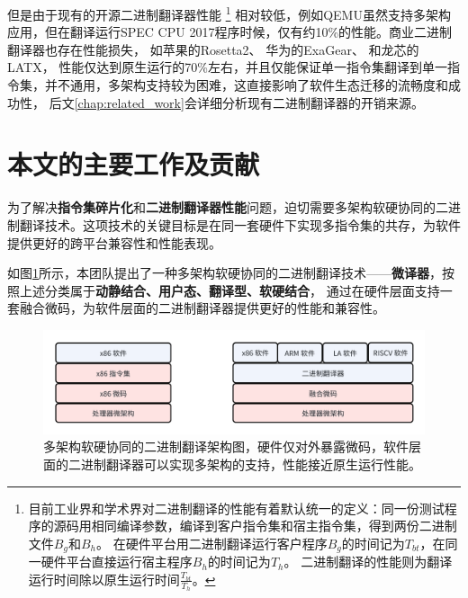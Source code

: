 但是由于现有的开源二进制翻译器性能
\footnote{
    目前工业界和学术界对二进制翻译的性能有着默认统一的定义：同一份测试程序的源码用相同编译参数，编译到客户指令集和宿主指令集，得到两份二进制文件$B_g$和$B_h$。
    在硬件平台用二进制翻译运行客户程序$B_g$的时间记为$T_{bt}$，在同一硬件平台直接运行宿主程序$B_h$的时间记为$T_h$。
    二进制翻译的性能则为翻译运行时间除以原生运行时间$\frac{T_{bt}}{T_h}$。
}
相对较低，例如QEMU\cite{bellardQEMUFastPortable2005}虽然支持多架构应用，但在翻译运行SPEC CPU 2017\cite{SPECCPU2017}程序时候，仅有约10\%的性能。商业二进制翻译器也存在性能损失，
如苹果的Rosetta2\cite{RosettaTranslationEnvironment, RunningIntelBinaries}、
华为的ExaGear\cite{KunPengExaGear}、
和龙芯的LATX\cite{LoongArchEnv2022, LoongArch2023}，
性能仅达到原生运行的70\%左右，并且仅能保证单一指令集翻译到单一指令集，并不通用，多架构支持较为困难，这直接影响了软件生态迁移的流畅度和成功性，
后文\ref{chap:related_work}会详细分析现有二进制翻译器的开销来源。

\section{本文的主要工作及贡献}

为了解决\textbf{指令集碎片化}和\textbf{二进制翻译器性能}问题，迫切需要多架构软硬协同的二进制翻译技术。这项技术的关键目标是在同一套硬件下实现多指令集的共存，为软件提供更好的跨平台兼容性和性能表现。

如图\ref{img:my_arch}所示，本团队提出了一种多架构软硬协同的二进制翻译技术——\textbf{微译器}，按照上述分类属于\textbf{动静结合、用户态、翻译型、软硬结合}，
通过在硬件层面支持一套融合微码，为软件层面的二进制翻译器提供更好的性能和兼容性。


\begin{figure}[h]
    \centering
    \includegraphics[width=1\linewidth]{./feishuImage/my_arch.png}
    \caption{多架构软硬协同的二进制翻译架构图，硬件仅对外暴露微码，软件层面的二进制翻译器可以实现多架构的支持，性能接近原生运行性能。}
    \label{img:my_arch}
  \end{figure}

